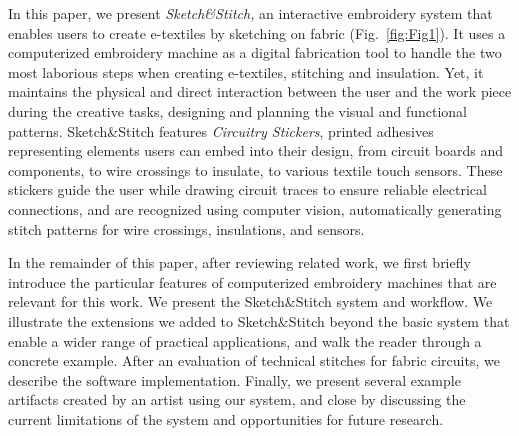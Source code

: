 \documentclass[header.tex]{subfiles}
\begin{document}


In this paper, we present \textit{Sketch\&Stitch,} an interactive embroidery system that enables users to create e-textiles by sketching on fabric (Fig.~\ref{fig:Fig1}). It uses a computerized embroidery machine as a digital fabrication tool to handle the two most laborious steps when creating e-textiles, stitching and insulation. Yet, it maintains the physical and direct interaction between the user and the work piece during the creative tasks, designing and planning the visual and functional patterns.  Sketch\&Stitch features \textit{Circuitry Stickers}, printed adhesives representing elements users can embed into their design, from circuit boards and components, to wire crossings to insulate, to various textile touch sensors. These stickers guide the user while drawing circuit traces to ensure reliable electrical connections, and are recognized using computer vision, automatically generating stitch patterns for wire crossings, insulations, and sensors.


In the remainder of this paper, after reviewing related work, we first briefly introduce the particular features of computerized embroidery machines that are relevant for this work. We present the Sketch\&Stitch system and workflow. We illustrate the extensions we added to Sketch\&Stitch beyond the basic system that enable a wider range of practical applications, and walk the reader through a concrete example. After an evaluation of technical stitches for fabric circuits, we describe the software implementation. Finally, we present several example artifacts created by an artist using our system, and close by discussing the current limitations of the system and opportunities for future research.
\end{document}
